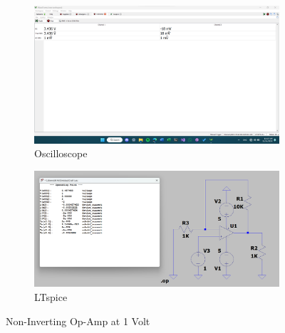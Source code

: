 \documentclass{zc-ust-hw}
\begin{document}
\begin{figure}[htpb]
  \centering
  \begin{subfigure}[b]{0.45\textwidth}
    \includegraphics[width=\textwidth]{figures/non-inv-opamp-1v.png}
    \caption{Oscilloscope}
  \end{subfigure}
  \hfill
  \begin{subfigure}[b]{0.45\textwidth}
    \includegraphics[width=\textwidth]{figures/non-inv-opamp-1v-lts.png}
    \caption{LTspice}
  \end{subfigure}
  \caption{Non-Inverting Op-Amp at 1 Volt}
\end{figure}
\end{document}
